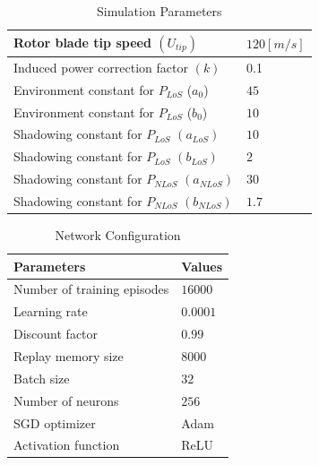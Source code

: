 \documentclass[journal,twocolumn]{IEEEtran}
\begin{document}
{\begin{table}[t]
\begin{center}
\begin{tabular}{ | m{5.75cm} | m{2cm} | }
   Rotor blade tip speed $(U_{tip})$ & $120 [m/s]$  \\ 
   \hline
   Induced power correction factor $(k)$ & 0.1 \\ 
   \hline
   Environment constant for $P_{LoS}$ ($a_0$)  & $45$ \\ 
   \hline
 Environment constant for $P_{LoS}$ ($b_0$)  & $10$ \\ 
   \hline
  Shadowing constant for $P_{LoS}$ $(a_{LoS})$  & $10$ \\ 
   \hline
  Shadowing constant for $P_{LoS}$ $(b_{LoS})$  & $2$ \\ 
   \hline
   Shadowing constant for $P_{NLoS}$ $(a_{NLoS})$ & $30$ \\
   \hline
   Shadowing constant for $P_{NLoS}$ $(b_{NLoS})$ & $1.7$ \\ 
   \hline

\end{tabular}
\caption{Simulation Parameters}
\label{table_env}
\end{center}
\end{table}


\begin{table}[t]
\begin{center}
\begin{tabular}{  m{4cm} m{4cm}  }
 \hline
 \hline
   \textbf{Parameters}  & \textbf{Values}\\ 
 \hline
   Number of training episodes & $16000$ \\ 
 
   Learning rate & $0.0001$ \\ 
 
   Discount factor & $0.99$\\ 
   
   Replay memory size & $8000$\\ 
 
   Batch size & $32$  \\ 
   
   Number of neurons & $256$  \\ 
   
   SGD optimizer & Adam  \\ 
   
   Activation function & ReLU  \\ 
   \hline
   \hline
 
\end{tabular}
\caption{Network Configuration}
\label{table_env}
\end{center}
\end{table}


}
\end{document}
